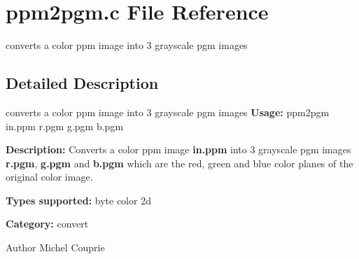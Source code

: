 \section{ppm2pgm.c File Reference}
\label{ppm2pgm_8c}


converts a color ppm image into 3 grayscale pgm images  




\subsection{Detailed Description}
converts a color ppm image into 3 grayscale pgm images {\bfseries Usage:} ppm2pgm in.ppm r.pgm g.pgm b.pgm

{\bfseries Description:} Converts a color ppm image {\bfseries in.ppm} into 3 grayscale pgm images {\bfseries r.pgm}, {\bfseries g.pgm} and {\bfseries b.pgm} which are the red, green and blue color planes of the original color image.

{\bfseries Types supported:} byte color 2d

{\bfseries Category:} convert

\begin{DoxyAuthor}{Author}
Michel Couprie 
\end{DoxyAuthor}

